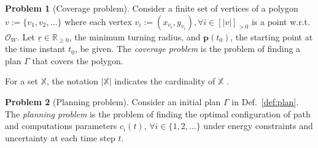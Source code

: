 \documentclass[letterpaper,10pt,journal,twoside]{IEEEtran}
\theoremstyle{definition}
\newtheorem{pb}{Problem}[section]
\begin{document}
\begin{pb}[Coverage problem]
  \label{pb:cov-pb}
  Consider a finite set of vertices of a polygon $v:=\{v_1,v_2,\dots\}$ where each vertex $v_i:=(x_{v_i},y_{v_i}),\forall i\in[|v|]_{>0}$
  is a point w.r.t. $\mathcal{O}_W$. Let $\underline{r}\in\mathbb{R}_{\geq 0}$, the minimum turning radius, and $\mathbf{p}(t_0)$, the starting point at the time instant $t_0$, be given. The \emph{coverage problem} is the problem of finding a plan $\Gamma$ that covers the polygon.
\end{pb}    

For a set $\mathbb{X}$, the notation $|\mathbb{X}|$ indicates the cardinality of $\mathbb{X}$%
.

\begin{pb}[Planning problem]
  \label{pb}
  Consider an initial plan $\Gamma$ in Def.~\ref{def:plan}. The \emph{planning problem} is the problem of finding the optimal configuration of path and computations parameters $c_i(t),\,\forall i\in\{1,2,\dots\}$ under energy constraints and uncertainty at each time step $t$.
\end{pb}



\end{document}
